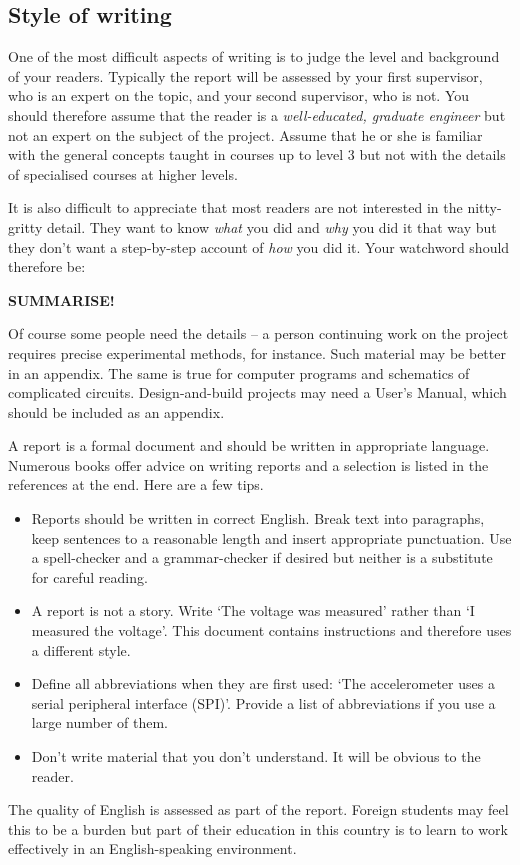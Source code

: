 \documentclass[a4paper,12pt]{article}
\begin{document}
\subsection{Style of writing}

One of the most difficult aspects of writing is to judge the level and background of your readers. Typically the report will be assessed by your first supervisor, who is an expert on the topic, and your second supervisor, who is not. You should therefore assume that the reader is a \emph{well-educated, graduate engineer} but not an expert on the subject of the project. Assume that he or she is familiar with the general concepts taught in courses up to level 3 but not with the details of specialised courses at higher levels.

It is also difficult to appreciate that most readers are not interested in the nitty-gritty detail. They want to know \emph{what} you did and \emph{why} you did it that way but they don't want a step-by-step account of \emph{how} you did it. Your watchword should therefore be:
\begin{center}
\textbf{SUMMARISE!}
\end{center}
Of course some people need the details -- a person continuing work on the project requires precise experimental methods, for instance. Such material may be better in an appendix. The same is true for computer programs and schematics of complicated circuits. Design-and-build projects may need a User's Manual, which should be included as an appendix. 

A report is a formal document and should be written in appropriate language. Numerous books offer advice on writing reports and a selection \cite{jve05,mkm06,dfb09,tmy05} is listed in the references at the end. Here are a few tips.
\begin{itemize}
\item
Reports should be written in correct English. Break text into paragraphs, keep sentences to a reasonable length and insert appropriate punctuation. Use a spell-checker and a grammar-checker if desired but neither is a substitute for careful reading. 
\item
A report is not a story. 
Write `The voltage was measured' rather than `I measured the voltage'. This document contains instructions and therefore uses a different style.
\item
Define all abbreviations when they are first used: `The accelerometer uses a serial peripheral interface (SPI)'. Provide a list of abbreviations if you use a large number of them.
\item
Don't write material that you don't understand. It will be obvious to the reader.
\end{itemize}
The quality of English is assessed as part of the report. Foreign students may feel this to be a burden but part of their education in this country is to learn to work effectively in an English-speaking environment. 
\end{document}
